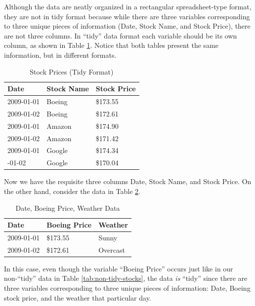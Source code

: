\documentclass[12pt, krantz2,]{krantz}
\begin{document}
Although the data are neatly organized in a rectangular spreadsheet-type format, they are not in tidy format because while there are three variables corresponding to three unique pieces of information (Date, Stock Name, and Stock Price), there are not three columns. In ``tidy'' data format each variable should be its own column, as shown in Table \ref{tab:tidy-stocks}. Notice that both tables present the same information, but in different formats.

\begin{table}[H]

\caption{\label{tab:tidy-stocks}Stock Prices (Tidy Format)}
\centering
\fontsize{10}{12}\selectfont
\begin{tabular}{lll}
\toprule
Date & Stock Name & Stock Price\\
\midrule
2009-01-01 & Boeing & \$173.55\\
2009-01-02 & Boeing & \$172.61\\
2009-01-01 & Amazon & \$174.90\\
2009-01-02 & Amazon & \$171.42\\
2009-01-01 & Google & \$174.34\\
\addlinespace
2009-01-02 & Google & \$170.04\\
\bottomrule
\end{tabular}
\end{table}

Now we have the requisite three columns Date, Stock Name, and Stock Price. On the other hand, consider the data in Table \ref{tab:tidy-stocks-2}.

\begin{table}[H]

\caption{\label{tab:tidy-stocks-2}Date, Boeing Price, Weather Data}
\centering
\fontsize{10}{12}\selectfont
\begin{tabular}{lll}
\toprule
Date & Boeing Price & Weather\\
\midrule
2009-01-01 & \$173.55 & Sunny\\
2009-01-02 & \$172.61 & Overcast\\
\bottomrule
\end{tabular}
\end{table}

In this case, even though the variable ``Boeing Price'' occurs just like in our non-``tidy'' data in Table \ref{tab:non-tidy-stocks}, the data \emph{is} ``tidy'' since there are three variables corresponding to three unique pieces of information: Date, Boeing stock price, and the weather that particular day.
\end{document}
